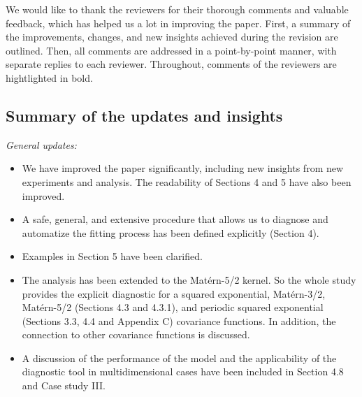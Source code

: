 \documentclass[11pt]{report}
\begin{document}
We would like to thank the reviewers for their thorough comments and valuable feedback, which has helped us a lot in improving the paper. First, a summary of the improvements, changes, and new insights achieved during the revision are outlined. Then, all comments are addressed in a point-by-point manner, with separate replies to each reviewer. 
Throughout, comments of the reviewers are hightlighted in bold.

\noindent \hdashrule{12.5cm}{0.2pt}{2mm 1pt}

\subsection*{Summary of the updates and insights}

\textit{General updates:}

\begin{itemize}

\item We have improved the paper significantly, including new insights from new experiments and analysis. The readability of Sections 4 and 5 have also been improved. 

\item A safe, general, and extensive procedure that allows us to diagnose and automatize the fitting process has been defined explicitly (Section 4). 

\item Examples in Section 5 have been clarified.

\item The analysis has been extended to the Mat\'ern-5/2 kernel. So the whole study provides the explicit diagnostic for a squared exponential, Mat\'ern-3/2, Mat\'ern-5/2 (Sections 4.3 and 4.3.1), and periodic squared exponential (Sections 3.3, 4.4 and Appendix C) covariance functions. In addition, the connection to other covariance functions is discussed.

\item A discussion of the performance of the model and the applicability of the diagnostic tool in multidimensional cases have been included in Section 4.8 and Case study III.


\end{itemize}
\end{document}
